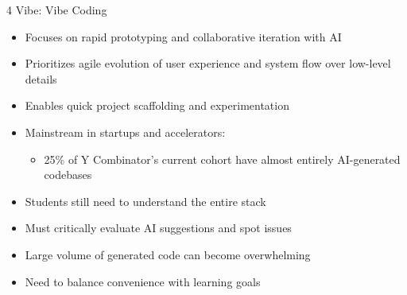 \documentclass[xcolor=dvipsnames, aspectratio=169]{beamer}
\begin{document}
\begin{frame}{4 Vibe: Vibe Coding}
  \begin{tcolorbox}[colback=green!10!white, colframe=green!60!black, title=Vibe Coding]
    \begin{itemize}
      \item Focuses on rapid prototyping and collaborative iteration with AI
      \item Prioritizes agile evolution of user experience and system flow over low-level details
      \item Enables quick project scaffolding and experimentation
      \item Mainstream in startups and accelerators:
        \begin{itemize}\footnotesize
          \item 25\% of Y Combinator's current cohort have almost entirely AI-generated codebases
        \end{itemize}
    \end{itemize}
  \end{tcolorbox}
  \begin{tcolorbox}[colback=red!10!white, colframe=red!60!black, title=Challenges]
    \begin{itemize}
      \item Students still need to understand the entire stack
      \item Must critically evaluate AI suggestions and spot issues
      \item Large volume of generated code can become overwhelming
      \item Need to balance convenience with learning goals
    \end{itemize}
  \end{tcolorbox}
\end{frame}
\end{document}

